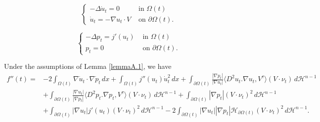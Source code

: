 \documentclass[10pt,a4paper]{amsart}
\newcommand{\abs}[1]{{\left|#1\right|}}
\begin{document}
\begin{equation}\label{Problema(u.)}
    \begin{cases}
        -\Delta \dot{u}_t=0 & \text{ in }\Omega(t)\\
        \dot{u}_t=-\nabla u_t\cdot V & \text{ on } \partial\Omega(t).
    \end{cases}
\end{equation}

\begin{equation}\label{Problema(p)}
    \begin{cases}
        -\Delta p_t= j'(u_t) & \text{ in }\Omega(t)\\
        p_t=0 & \text{ on } \partial\Omega(t).
    \end{cases}
\end{equation}

\begin{lemma}
    Under the assumptions of Lemma \ref{lemmaA.1}, we have
    \begin{equation}\label{dersec(3)}
    \begin{split}
        f''(t)=&-2\int_{\Omega(t)}\nabla \dot{u}_t\cdot\nabla\dot{p}_t \,dx+\int_{\Omega(t)}j''(u_t)\dot{u}_t^2\,dx+\int_{\partial\Omega(t)}\frac{\abs{\nabla p_t}}{\abs{\nabla u_t}}\langle D^2u_t.\nabla u_t,V^\tau\rangle(V\cdot\nu_t)\,d\mathcal{H}^{n-1}\\
        &+\int_{\partial\Omega(t)}\frac{\abs{\nabla u_t}}{\abs{\nabla p_t}}\langle D^2p_t.\nabla p_t,V^\tau\rangle(V\cdot\nu_t)\,d\mathcal{H}^{n-1}+\int_{\partial\Omega(t)}\abs{\nabla p_t}(V\cdot\nu_t)^2\,d\mathcal{H}^{n-1}\\
        &+\int_{\partial\Omega(t)}\abs{\nabla u_t}j'(u_t)(V\cdot\nu_t)^2\,d\mathcal{H}^{n-1}-2\int_{\partial\Omega(t)}\abs{\nabla u_t}\abs{\nabla p_t}\mathscr{H}_{\partial\Omega(t)}(V\cdot\nu_t)^2\,d\mathcal{H}^{n-1}.
    \end{split}
\end{equation}
\end{lemma}
\end{document}
